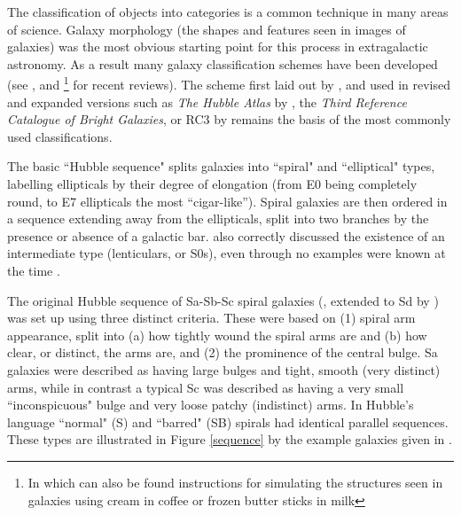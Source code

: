 \documentclass[usenatbib]{mn2e}
\begin{document}
The classification of objects into categories is a common technique in many areas of science. Galaxy morphology (the shapes and features seen in images of galaxies) was the most obvious starting point for this process in extragalactic astronomy. %
As a result many galaxy classification schemes have been developed (see \citealt{Buta2013}, and \citealt{Sandage2005}\footnote{In which can also be found instructions for simulating the structures seen in galaxies using cream in coffee or frozen butter sticks in milk} for recent reviews).
The scheme first laid out by \citet{Hubble1926,Hubble1936}, and used in revised and expanded versions such as {\it The Hubble Atlas} by \citet{Sandage1961}, the {\it Third Reference Catalogue of Bright Galaxies}, or RC3 by \citet{1991rc3..book.....D} remains the basis of the most commonly used classifications. 

The basic ``Hubble sequence" splits galaxies into ``spiral" and ``elliptical" types, labelling ellipticals by their degree of elongation (from E0 being completely round, to E7 ellipticals the most ``cigar-like''). Spiral galaxies are then ordered in a sequence extending away from the ellipticals, split into two branches by the presence or absence of a galactic bar. 
\citet{Hubble1936} also correctly discussed the existence of an intermediate type (lenticulars, or S0s), even through no examples were known at the time \citep{Buta2013}. 

The original Hubble sequence of Sa-Sb-Sc spiral galaxies (\citealt{Hubble1926}, extended to Sd by \citealt{1959HDP....53..275D}) was set up using three distinct criteria. These were based on (1) spiral arm appearance, split into (a) how tightly wound the spiral arms are and (b) how clear, or distinct, the arms are, and (2) the prominence of the central bulge. Sa galaxies were described as having large bulges and tight, smooth (very distinct) arms, while in contrast a typical Sc was described as having a very small ``inconspicuous" bulge and very loose patchy (indistinct) arms. In Hubble's language ``normal" (S) and ``barred" (SB) spirals had identical parallel sequences. These types are illustrated in Figure \ref{sequence} by the example galaxies given in \citet{Hubble1926}. 
\end{document}
